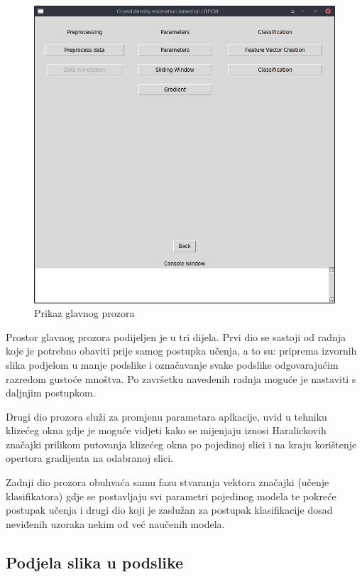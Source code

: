 \documentclass[times, utf8, zavrsni]{fer}
\begin{document}
\begin{figure}[ht]
\centering
\includegraphics[scale=0.4]{img/mainscreen.png}
\caption{Prikaz glavnog prozora}
\end{figure}

Prostor glavnog prozora podijeljen je u tri dijela. Prvi dio se sastoji
od radnja koje je potrebno obaviti prije samog postupka učenja, a to su:
priprema izvornih slika podjelom u manje podslike i označavanje svake 
podslike odgovarajućim razredom gustoće mnoštva. Po završetku navedenih radnja
moguće je nastaviti s daljnjim postupkom.

\bigbreak

Drugi dio prozora služi za promjenu parametara aplkacije, uvid u tehniku 
klizećeg okna gdje je moguće vidjeti kako se mijenjaju iznosi Haralickovih značajki
prilikom putovanja klizećeg okna po pojedinoj slici i na kraju korištenje
opertora gradijenta na odabranoj slici.

\newpage

Zadnji dio prozora obuhvaća samu fazu stvaranja vektora značajki (učenje
klasifikatora) gdje se postavljaju svi parametri pojedinog modela te pokreće
postupak učenja i drugi dio koji je zaslužan za postupak klasifikacije
dosad neviđenih uzoraka nekim od već naučenih modela.


\subsection{Podjela slika u podslike}
\end{document}
